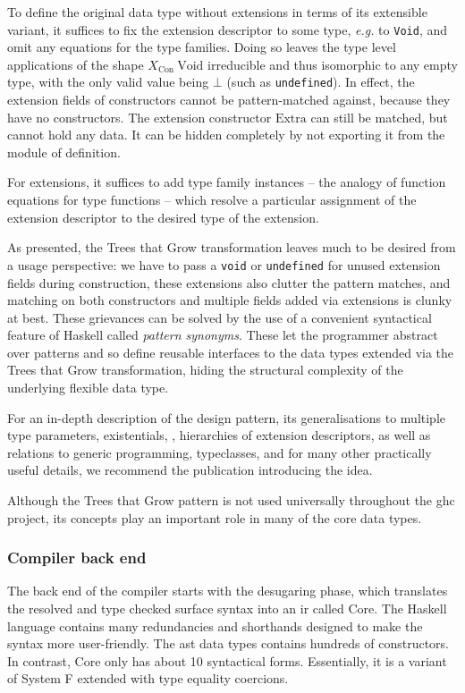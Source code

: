 \documentclass[thesis=B,english]{FITthesis}[2019/12/23]
\newcommand{\eg}{\emph{e.g.}\xspace}
\newcommand{\hsType}[1]{\texttt{#1}}
\newcommand{\hsIdent}[1]{\texttt{#1}}
\begin{document}
\begin{tcolorbox}[parbox=false, breakable, title=Trees that Grow]
To define the original data type without extensions in terms of its extensible
variant, it suffices to fix the extension descriptor to some type, \eg to
\hsType{Void}, and omit any equations for the type families. Doing so leaves
the type level applications of the shape $X_{\mathrm{Con}}~\mathrm{Void}$
irreducible and thus isomorphic to any empty type, with the only valid value
being $\bot$ (such as \hsIdent{undefined}). In effect, the extension fields of
constructors cannot be pattern-matched against, because they have no
constructors. The extension constructor $\mathrm{Extra}$ can still be matched,
but cannot hold any data. It can be hidden completely by not exporting it from
the module of definition.

For extensions, it suffices to add type family instances -- the analogy of
function equations for type functions -- which resolve a particular assignment
of the extension descriptor to the desired type of the extension.

As presented, the Trees that Grow transformation leaves much to be desired from
a usage perspective: we have to pass a \hsIdent{void} or \hsIdent{undefined}
for unused extension fields during construction, these extensions also clutter
the pattern matches, and matching on both constructors and multiple fields
added via extensions is clunky at best. These grievances can be solved by the
use of a convenient syntactical feature of Haskell called \textit{pattern
synonyms}\cite{pattern-synonyms}. These let the programmer abstract over
patterns and so define reusable interfaces to the data types extended via the
Trees that Grow transformation, hiding the structural complexity of the
underlying flexible data type.

For an in-depth description of the design pattern, its generalisations to
multiple type parameters, existentials, , hierarchies of
extension descriptors, as well as relations to generic programming,
typeclasses, and for many other practically useful details, we recommend the
publication introducing the idea\cite{trees-that-grow}.

Although the Trees that Grow pattern is not used universally throughout the
\acrshort{ghc} project, its concepts play an important role in many of the core
data types.
\end{tcolorbox}

\subsubsection*{Compiler back end}
The back end of the compiler starts with the desugaring phase, which translates
the resolved and type checked surface syntax into an \acrfull{ir} called Core.
The Haskell language contains many redundancies and shorthands designed to make
the syntax more user-friendly. The \acrshort{ast} data types contains hundreds
of constructors. In contrast, Core only has about 10 syntactical forms.
Essentially, it is a variant of System F extended with type equality
coercions\cite{system-fc}.
\end{document}
